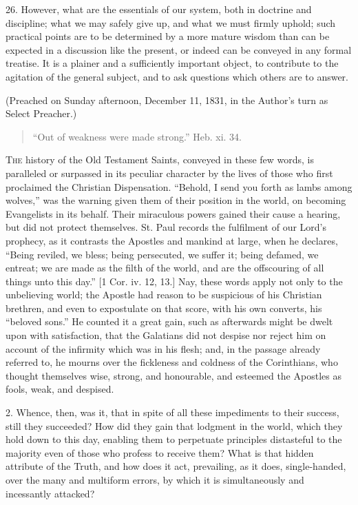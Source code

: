 26. However, what are the essentials of our system, both in
doctrine and discipline; what we may safely give up, and what we must
firmly uphold; such practical points are to be determined by a more
mature wisdom than can be expected in a discussion like the present,
or indeed can be conveyed in any formal treatise. It is a plainer and
a sufficiently important object, to contribute to the agitation of the
general subject, and to ask questions which others are to answer.

(Preached on Sunday afternoon, December 11, 1831, in the Author's
turn as Select Preacher.)


\begin{quote}

``Out of weakness were made strong.'' Heb. xi. 34.

\end{quote}

T\textsc{he} history of the Old Testament Saints, conveyed in these few
words, is paralleled or surpassed in its peculiar character by the
lives of those who first proclaimed the Christian Dispensation.
``Behold, I send you forth as lambs among wolves,'' was the
warning given them of their position in the world, on becoming
Evangelists in its behalf. Their miraculous powers gained their cause
a hearing, but did not protect themselves. St. Paul records the
fulfilment of our Lord's prophecy, as it contrasts the Apostles and
mankind at large, when he declares, ``Being reviled, we bless;
being persecuted, we suffer it; being defamed, we entreat; we are made
as the filth of the world, and are the offscouring of all things unto
this day.'' [1 Cor. iv. 12, 13.] Nay, these words apply not only
to the unbelieving world; the Apostle had reason to be suspicious of
his Christian brethren, and even to expostulate on that score, with
his own converts, his ``beloved sons.'' He counted it a great
gain, such as afterwards might be dwelt upon with satisfaction, that
the Galatians did not despise nor reject him on account of the
infirmity which was in his flesh; and, in the passage already referred
to, he mourns over the fickleness and coldness of the Corinthians, who
thought themselves wise, strong, and honourable, and esteemed the
Apostles as fools, weak, and despised.

2. Whence, then, was it, that in spite of all these impediments to
their success, still they succeeded? How did they gain that lodgment
in the world, which they hold down to this day, enabling them to
perpetuate principles distasteful to the majority even of those who
profess to receive them? What is that hidden attribute of the Truth,
and how does it act, prevailing, as it does, single-handed, over the
many and multiform errors, by which it is simultaneously and
incessantly attacked?

